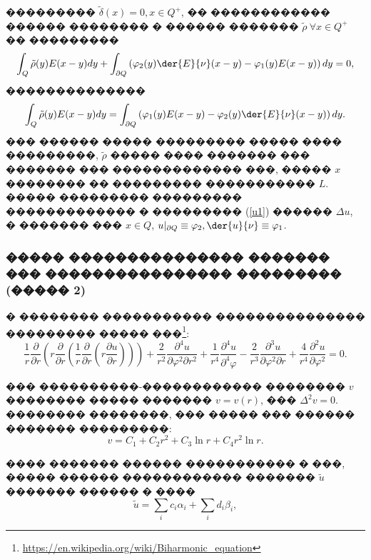 \documentclass[a4paper]{article}
\begin{document}
��������� $\tilde{\delta}(x)=0, x \in Q^+$, �� ������������ ������ �������� � ������ ������� $\tilde{\rho}\ \forall x \in Q^+$ �� ���������
\begin{equation}
  \int_Q \tilde{\rho}(y) E(x-y) dy + \int_{\partial Q} \left(\varphi_2(y)\der{E}{\nu}(x-y)-\varphi_1(y) E(x-y) \right) dy=0,
\end{equation}
��������������
\begin{equation}
  \int_Q \tilde{\rho}(y) E(x-y) dy = \int_{\partial Q} \left(\varphi_1(y) E(x-y) -\varphi_2(y)\der{E}{\nu}(x-y)\right) dy.
  \label{bgogz}
\end{equation}
��� ������ ����� ��������� ����� ���� ���������, $\tilde{\rho}$ ����� ���� ������� ��� ������� ��� ������������� ���, ����� $x$ �������� �� ��������� ����������� $L$.
����� ��������� ��������� ������������� � ��������� (\ref{u1}) ������ $\Delta u$, � ������� ��� $x \in Q$, $u|_{\partial Q} \equiv \varphi_2, \der{u}{\nu} \equiv \varphi_1$.

\subsubsection{����� ��������������� ������� ��� ���������������� ��������� (����� 2)}

� �������� ����������� ��������������� ��������� ����� ���\footnote{\url{https://en.wikipedia.org/wiki/Biharmonic_equation}}:
\begin{equation}
  \dfrac{1}{r} \dfrac{\partial}{\partial r} \left(r \dfrac{\partial}{\partial r} \left( \dfrac{1}{r} \dfrac{\partial}{\partial r} \left(r \dfrac{\partial u}{\partial r}   \right)  \right)    \right) + \dfrac{2}{r^2} \dfrac{\partial^4 u}{\partial \varphi^2 \partial r^2} +\dfrac{1}{r^4} \dfrac{\partial^4 u}{\partial^4 \varphi} - \dfrac{2}{r^3} \dfrac{\partial^3 u}{\partial \varphi^2 \partial r} + \dfrac{4}{r^4} \dfrac{\partial^2 u}{\partial \varphi^2}=0.
\end{equation}

��� ����������-������������ �������� $v$ �������� ����� ������� $v=v(r)$, ��� $\Delta^2 v=0$.
�������� ��������, ��� ����� ��� ������ ������� ���������:
\begin{equation*}
  v = C_1 + C_2 r^2 + C_3 \ln r + C_4 r^2 \ln r.
\end{equation*}

���� ������� ������ ����������� � ���, ����� ������ ������������ ������� $\tilde{u}$ ������� ������ � ����
\begin{equation*}
  \tilde{u} = \sum_i c_i \alpha_i + \sum_i d_i \beta_i,
\end{equation*}
\end{document}
